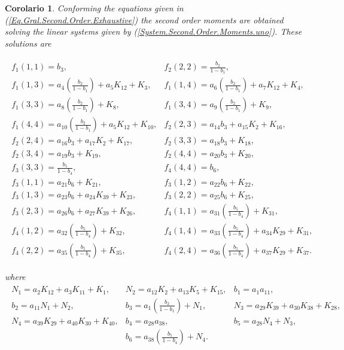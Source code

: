 \documentclass{article}
\newtheorem{Coro}{Corolario}
\begin{document}
\begin{Coro}\label{Coro.Second.Order.Eqs}
Conforming the equations given in (\ref{Eq.Gral.Second.Order.Exhaustive}) the second order moments are obtained solving the linear systems given by  (\ref{System.Second.Order.Moments.uno}). These solutions are 

\begin{eqnarray}\label{Sol.System.Second.Order.Exhaustive}
\begin{array}{ll}
f_{1}\left(1,1\right)=b_{3},&
f_{2}\left(2,2\right)=\frac{b_{2}}{1-b_{1}},\\
f_{1}\left(1,3\right)=a_{4}\left(\frac{b_{2}}{1-b_{1}}\right)+a_{5}K_{12}+K_{3},&
f_{1}\left(1,4\right)=a_{6}\left(\frac{b_{2}}{1-b_{1}}\right)+a_{7}K_{12}+K_{4},\\
f_{1}\left(3,3\right)=a_{8}\left(\frac{b_{2}}{1-b_{1}}\right)+K_{8},&
f_{1}\left(3,4\right)=a_{9}\left(\frac{b_{2}}{1-b_{1}}\right)+K_{9},\\
f_{1}\left(4,4\right)=a_{10}\left(\frac{b_{2}}{1-b_{1}}\right)+a_{5}K_{12}+K_{10},&
f_{2}\left(2,3\right)=a_{14}b_{3}+a_{15}K_{2}+K_{16},\\
f_{2}\left(2,4\right)=a_{16}b_{3}+a_{17}K_{2}+K_{17},&
f_{2}\left(3,3\right)=a_{18}b_{3}+K_{18},\\
f_{2}\left(3,4\right)=a_{19}b_{3}+K_{19},&
f_{2}\left(4,4\right)=a_{20}b_{3}+K_{20},\\
f_{3}\left(3,3\right)=\frac{b_{5}}{1-b_{4}},&
f_{4}\left(4,4\right)=b_{6},\\
f_{3}\left(1,1\right)=a_{21}b_{6}+K_{21},&
f_{3}\left(1,2\right)=a_{22}b_{6}+K_{22},\\
f_{3}\left(1,3\right)=a_{23}b_{6}+a_{24}K_{39}+K_{23},&
f_{3}\left(2,2\right)=a_{25}b_{6}+K_{25},\\
f_{3}\left(2,3\right)=a_{26}b_{6}+a_{27}K_{39}+K_{26},&
f_{4}\left(1,1\right)=a_{31}\left(\frac{b_{5}}{1-b_{4}}\right)+K_{31},\\
f_{4}\left(1,2\right)=a_{32}\left(\frac{b_{5}}{1-b_{4}}\right)+K_{32},&
f_{4}\left(1,4\right)=a_{33}\left(\frac{b_{5}}{1-b_{4}}\right)+a_{34}K_{29}+K_{31},\\
f_{4}\left(2,2\right)=a_{35}\left(\frac{b_{5}}{1-b_{4}}\right)+K_{35},&
f_{4}\left(2,4\right)=a_{36}\left(\frac{b_{5}}{1-b_{4}}\right)+a_{37}K_{29}+K_{37}.
\end{array}
\end{eqnarray}

where
\begin{eqnarray*}
\begin{array}{lll}
N_{1}=a_{2}K_{12}+a_{3}K_{11}+K_{1},&
N_{2}=a_{12}K_{2}+a_{13}K_{5}+K_{15},&
b_{1}=a_{1}a_{11},\\
b_{2}=a_{11}N_{1}+N_{2},&
b_{3}=a_{1}\left(\frac{b_{2}}{1-b_{1}}\right)+N_{1},&
N_{3}=a_{29}K_{39}+a_{30}K_{38}+K_{28},\\
N_{4}=a_{39}K_{29}+a_{40}K_{30}+K_{40},&
b_{4}=a_{28}a_{38},&
b_{5}=a_{28}N_{4}+N_{3},\\
&b_{6}=a_{38}\left(\frac{b_{5}}{1-b_{4}}\right)+N_{4}.&
\end{array}
\end{eqnarray*}

\end{Coro}
\end{document}
